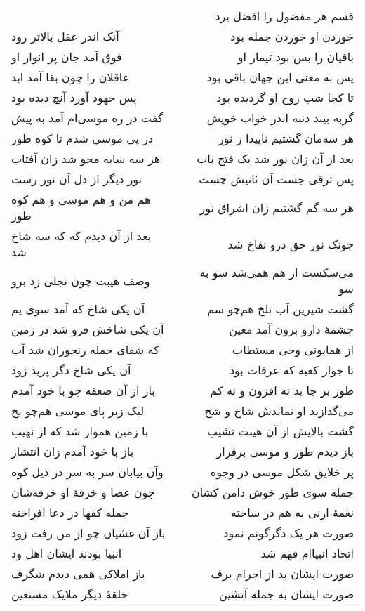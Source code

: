\begin{center}
\begin{longtable}{l p{0.5cm} r}
&&
قسم هر مفضول را افضل برد
\\
آنک اندر عقل بالاتر رود
&&
خوردن او خوردن جمله بود
\\
فوق آمد جان پر انوار او
&&
باقیان را بس بود تیمار او
\\
عاقلان را چون بقا آمد ابد
&&
پس به معنی این جهان باقی بود
\\
پس جهود آورد آنچ دیده بود
&&
تا کجا شب روح او گردیده بود
\\
گفت در ره موسی‌ام آمد به پیش
&&
گربه بیند دنبه اندر خواب خویش
\\
در پی موسی شدم تا کوه طور
&&
هر سه‌مان گشتیم ناپیدا ز نور
\\
هر سه سایه محو شد زان آفتاب
&&
بعد از آن زان نور شد یک فتح باب
\\
نور دیگر از دل آن نور رست
&&
پس ترقی جست آن ثانیش چست
\\
هم من و هم موسی و هم کوه طور
&&
هر سه گم گشتیم زان اشراق نور
\\
بعد از آن دیدم که که سه شاخ شد
&&
چونک نور حق درو نفاخ شد
\\
وصف هیبت چون تجلی زد برو
&&
می‌سکست از هم همی‌شد سو به سو
\\
آن یکی شاخ که آمد سوی یم
&&
گشت شیرین آب تلخ هم‌چو سم
\\
آن یکی شاخش فرو شد در زمین
&&
چشمهٔ دارو برون آمد معین
\\
که شفای جمله رنجوران شد آب
&&
از همایونی وحی مستطاب
\\
آن یکی شاخ دگر پرید زود
&&
تا جوار کعبه که عرفات بود
\\
باز از آن صعقه چو با خود آمدم
&&
طور بر جا بد نه افزون و نه کم
\\
لیک زیر پای موسی هم‌چو یخ
&&
می‌گدازید او نماندش شاخ و شخ
\\
با زمین هموار شد که از نهیب
&&
گشت بالایش از آن هیبت نشیب
\\
باز با خود آمدم زان انتشار
&&
باز دیدم طور و موسی برقرار
\\
وآن بیابان سر به سر در ذیل کوه
&&
پر خلایق شکل موسی در وجوه
\\
چون عصا و خرقهٔ او خرقه‌شان
&&
جمله سوی طور خوش دامن کشان
\\
جمله کفها در دعا افراخته
&&
نغمهٔ ارنی به هم در ساخته
\\
باز آن غشیان چو از من رفت زود
&&
صورت هر یک دگرگونم نمود
\\
انبیا بودند ایشان اهل ود
&&
اتحاد انبیاام فهم شد
\\
باز املاکی همی دیدم شگرف
&&
صورت ایشان بد از اجرام برف
\\
حلقهٔ دیگر ملایک مستعین
&&
صورت ایشان به جمله آتشین

\end{longtable}
\end{center}
